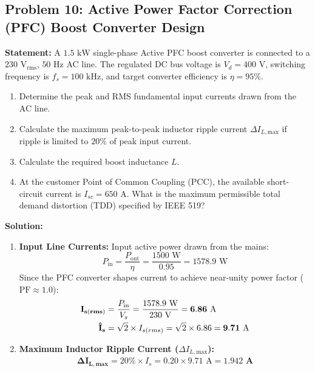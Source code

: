 \documentclass[11pt,a4paper]{article}
\begin{document}
\subsection{Problem 10: Active Power Factor Correction (PFC) Boost Converter Design}
\begin{examplebox}
\textbf{Statement:} A $1.5\text{ kW}$ single-phase Active PFC boost converter is connected to a $230\text{ V}_{\text{rms}}$, $50\text{ Hz}$ AC line. The regulated DC bus voltage is $V_d = 400\text{ V}$, switching frequency is $f_s = 100\text{ kHz}$, and target converter efficiency is $\eta = 95\%$.
\begin{enumerate}
  \item Determine the peak and RMS fundamental input currents drawn from the AC line.
  \item Calculate the maximum peak-to-peak inductor ripple current $\Delta I_{L,\text{max}}$ if ripple is limited to $20\%$ of peak input current.
  \item Calculate the required boost inductance $L$.
  \item At the customer Point of Common Coupling (PCC), the available short-circuit current is $I_{sc} = 650\text{ A}$. What is the maximum permissible total demand distortion (TDD) specified by IEEE 519?
\end{enumerate}

\tcblower
\textbf{Solution:}
\begin{enumerate}
  \item \textbf{Input Line Currents:}
  Input active power drawn from the mains:
  \begin{equation*}
  P_{\text{in}} = \frac{P_{\text{out}}}{\eta} = \frac{1500\text{ W}}{0.95} = 1578.9\text{ W}
  \end{equation*}
  Since the PFC converter shapes current to achieve near-unity power factor ($\text{PF} \approx 1.0$):
  \begin{align*}
  \mathbf{I_{s(rms)}} &= \frac{P_{\text{in}}}{V_s} = \frac{1578.9\text{ W}}{230\text{ V}} = \mathbf{6.86\text{ A}} \notag\\
  \mathbf{\hat{I}_s} &= \sqrt{2} \times I_{s(rms)} = \sqrt{2} \times 6.86 = \mathbf{9.71\text{ A}}
  \end{align*}

  \item \textbf{Maximum Inductor Ripple Current ($\Delta I_{L,\text{max}}$):}
  \begin{equation*}
  \mathbf{\Delta I_{L,\text{max}}} = 20\% \times \hat{I}_s = 0.20 \times 9.71\text{ A} = \mathbf{1.942\text{ A}}
  \end{equation*}


\end{enumerate}
\end{examplebox}
\end{document}
